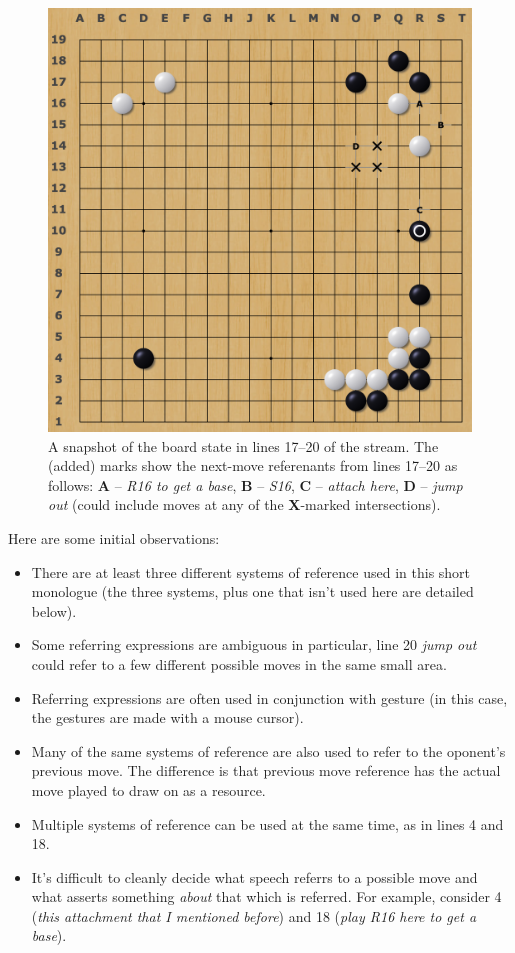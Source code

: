 \documentclass{scrartcl}
\begin{document}
\begin{figure}[ht]
  \centering
  \includegraphics[width=.5\textwidth]{diagram.png}
  \caption{A snapshot of the board state in lines 17--20 of the stream. The (added) marks show the next-move referenants from lines 17--20 as follows: \textbf{A} -- \textit{R16 to get a base}, \textbf{B} -- \textit{S16}, \textbf{C} -- \textit{attach here}, \textbf{D} -- \textit{jump out} (could include moves at any of the \textbf{X}-marked intersections).}
\end{figure}

\noindent Here are some initial observations:
\begin{itemize}
  \item There are at least three different systems of reference used in this short monologue (the three systems, plus one that isn't used here are detailed below). 
  \item Some referring expressions are ambiguous in particular, line 20 \textit{jump out} could refer to a few different possible moves in the same small area.
  \item Referring expressions are often used in conjunction with gesture (in this case, the gestures are made with a mouse cursor).
  \item Many of the same systems of reference are also used to refer to the oponent's previous move. The difference is that previous move reference has the actual move played to draw on as a resource.
  \item Multiple systems of reference can be used at the same time, as in lines 4 and 18.
  \item It's difficult to cleanly decide what speech referrs to a possible move and 
    what asserts something \emph{about} that which is referred. For example, consider 4 (\textit{this attachment that I mentioned before}) and 18 (\textit{play R16 here to get a base}).
\end{itemize}
\end{document}
